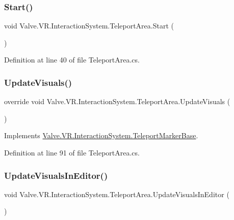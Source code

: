 \subsubsection{\texorpdfstring{Start()}{Start()}}
{\footnotesize\ttfamily void Valve.\+V\+R.\+Interaction\+System.\+Teleport\+Area.\+Start (\begin{DoxyParamCaption}{ }\end{DoxyParamCaption})}



Definition at line 40 of file Teleport\+Area.\+cs.

\mbox{\label{class_valve_1_1_v_r_1_1_interaction_system_1_1_teleport_area_a385c0b75611a1d7b120fc5e45e69730e}} 
\subsubsection{\texorpdfstring{UpdateVisuals()}{UpdateVisuals()}}
{\footnotesize\ttfamily override void Valve.\+V\+R.\+Interaction\+System.\+Teleport\+Area.\+Update\+Visuals (\begin{DoxyParamCaption}{ }\end{DoxyParamCaption})\hspace{0.3cm}{\ttfamily [virtual]}}



Implements \mbox{\hyperlink{class_valve_1_1_v_r_1_1_interaction_system_1_1_teleport_marker_base_a5faad5c973035110d88fec8ed93e91ff}{Valve.\+V\+R.\+Interaction\+System.\+Teleport\+Marker\+Base}}.



Definition at line 91 of file Teleport\+Area.\+cs.

\mbox{\label{class_valve_1_1_v_r_1_1_interaction_system_1_1_teleport_area_adac79e154fb040c95d9d842aa5a1fe23}} 
\subsubsection{\texorpdfstring{UpdateVisualsInEditor()}{UpdateVisualsInEditor()}}
{\footnotesize\ttfamily void Valve.\+V\+R.\+Interaction\+System.\+Teleport\+Area.\+Update\+Visuals\+In\+Editor (\begin{DoxyParamCaption}{ }\end{DoxyParamCaption})}



